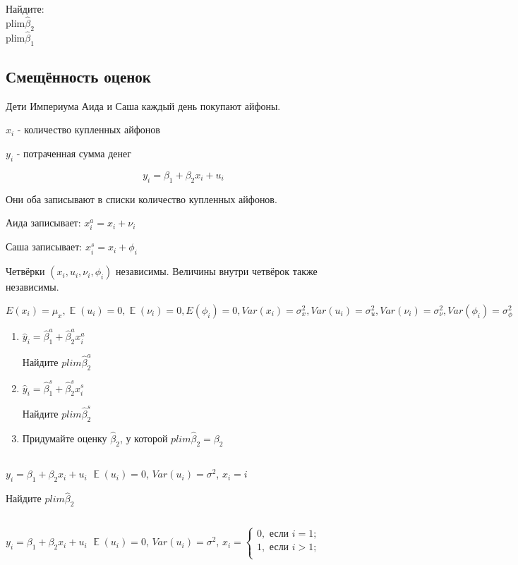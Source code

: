\documentclass[10pt, a4paper]{extarticle}
\def \hb{\hat{\beta}}
\DeclareMathOperator{\E}{\mathbb{E}}
\begin{document}
Найдите:\\
$\text{plim} \hat{\beta}_2$\\
$\text{plim} \hat{\beta}_1$

\subsection{Смещённость оценок}

Дети Империума Аида и Саша каждый день покупают айфоны. 

$x_i$ - количество купленных айфонов

$y_i$ - потраченная сумма денег

\[
y_i = \beta_1 + \beta_2 x_i + u_i
\]

Они оба записывают в списки количество купленных айфонов.

Аида записывает: $x_i^a = x_i + \nu_i$

Саша записывает: $x_i^s = x_i + \phi_i$

Четвёрки $(x_i, u_i, \nu_i, \phi_i)$ независимы. Величины внутри четвёрок также независимы.


$E(x_i) = \mu_x, \E(u_i) = 0, \E(\nu_i) = 0, E(\phi_i) = 0, Var(x_i) = \sigma_x^2, Var(u_i) = \sigma_u^2, Var(\nu_i) = \sigma_\nu^2, Var(\phi_i) = \sigma_\phi^2$

\begin{enumerate}
	\item $\hat{y}_i = \hb_1^a + \hb_2^ax_i^a$
	
	Найдите $plim \hb_2^a$
	
	\item $\hat{y}_i = \hb_1^s + \hb_2^sx_i^s$
	
	Найдите $plim \hb_2^s$
	
	\item Придумайте оценку $\hb_2$, у которой $plim \hb_2 = \beta_2$
	
\end{enumerate}

\subsection{}
$y_i = \beta_1 + \beta_2 x_i + u_i$
$\E(u_i) = 0$, $Var(u_i)=\sigma^2$, $x_i = i$

Найдите $plim \hb_2$

\subsection{}
$y_i = \beta_1 + \beta_2 x_i + u_i$
$\E(u_i) = 0$, $Var(u_i)=\sigma^2$, 
$x_i = 
\begin{cases}
0, \text{ если } i = 1; \\
1, \text{ если } i > 1; \\
\end{cases}
$
\end{document}
